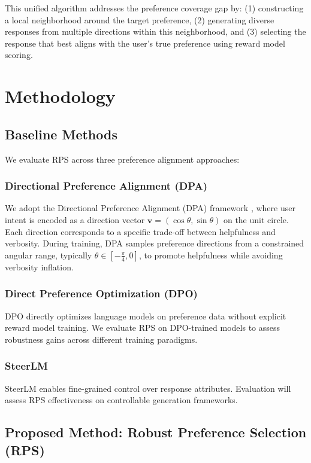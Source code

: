 \documentclass{article} %
\begin{document}
This unified algorithm addresses the preference coverage gap by: (1) constructing a local neighborhood around the target preference, (2) generating diverse responses from multiple directions within this neighborhood, and (3) selecting the response that best aligns with the user's true preference using reward model scoring.

\section{Methodology}

\subsection{Baseline Methods}

We evaluate RPS across three preference alignment approaches:

\subsubsection{Directional Preference Alignment (DPA)}
We adopt the Directional Preference Alignment (DPA) framework \cite{rafailov2024direct}, where user intent is encoded as a direction vector $\mathbf{v} = (\cos \theta, \sin \theta)$ on the unit circle. Each direction corresponds to a specific trade-off between helpfulness and verbosity. During training, DPA samples preference directions from a constrained angular range, typically $\theta \in [-\frac{\pi}{4}, 0]$, to promote helpfulness while avoiding verbosity inflation.

\subsubsection{Direct Preference Optimization (DPO)} 
DPO \cite{rafailov2024direct} directly optimizes language models on preference data without explicit reward model training. We evaluate RPS on DPO-trained models to assess robustness gains across different training paradigms.

\subsubsection{SteerLM}
SteerLM \cite{dong2023steerlm} enables fine-grained control over response attributes. Evaluation will assess RPS effectiveness on controllable generation frameworks.

\subsection{Proposed Method: Robust Preference Selection (RPS)}
\end{document}
